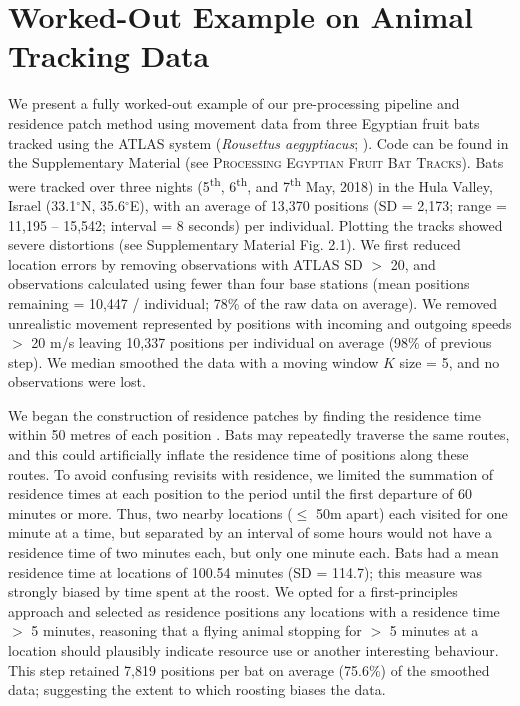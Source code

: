 \documentclass[10pt,paper=a4,headings=standardclasses
]{scrartcl}
\begin{document}
\section{Worked-Out Example on Animal Tracking Data}

We present a fully worked-out example of our pre-processing pipeline and residence patch method using movement data from three Egyptian fruit bats tracked using the ATLAS system (\textit{Rousettus aegyptiacus}; \citet{toledo2020}).
Code can be found in the Supplementary Material (see \textsc{Processing Egyptian Fruit Bat Tracks}).
Bats were tracked over three nights (5\textsuperscript{th}, 6\textsuperscript{th}, and 7\textsuperscript{th} May, 2018) in the Hula Valley, Israel (33.1$^{\circ}$N, 35.6$^{\circ}$E), with an average of 13,370 positions (SD = 2,173; range = 11,195 -- 15,542; interval = 8 seconds) per individual.
Plotting the tracks showed severe distortions (see Supplementary Material Fig. 2.1).
We first reduced location errors by removing observations with ATLAS SD $>$ 20, and observations calculated using fewer than four base stations (mean positions remaining = 10,447 / individual; 78\% of the raw data on average).
We removed unrealistic movement represented by positions with incoming and outgoing speeds $>$ 20 m/s leaving 10,337 positions per individual on average (98\% of previous step).
We median smoothed the data with a moving window $K$ size = 5, and no observations were lost.

We began the construction of residence patches by finding the residence time within 50 metres of each position \citep{bracis2018}.
Bats may repeatedly traverse the same routes, and this could artificially inflate the residence time of positions along these routes.
To avoid confusing revisits with residence, we limited the summation of residence times at each position to the period until the first departure of 60 minutes or more.
Thus, two nearby locations ($\leq$ 50m apart) each visited for one minute at a time, but separated by an interval of some hours would not have a residence time of two minutes each, but only one minute each.
Bats had a mean residence time at locations of 100.54 minutes (SD = 114.7); this measure was strongly biased by time spent at the roost.
We opted for a first-principles approach and selected as residence positions any locations with a residence time $>$ 5 minutes, reasoning that a flying animal stopping for $>$ 5 minutes at a location should plausibly indicate resource use or another interesting behaviour.
This step retained 7,819 positions per bat on average (75.6\%) of the smoothed data; suggesting the extent to which roosting biases the data.
\end{document}
